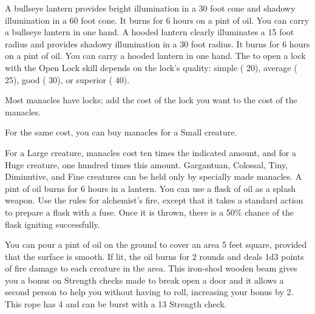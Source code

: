          A bullseye lantern provides bright illumination in a 30 foot cone and shadowy illumination in a 60 foot cone. It burns for 6 hours on a pint of oil. You can carry a bullseye lantern in one hand.
         A hooded lantern clearly illuminates a 15 foot radius and provides shadowy illumination in a 30 foot radius. It burns for 6 hours on a pint of oil. You can carry a hooded lantern in one hand.
         The  to open a lock with the Open Lock skill depends on the lock's quality: simple ( 20), average ( 25), good ( 30), or superior ( 40).
        \par Most manacles have locks; add the cost of the lock you want to the cost of the manacles.
        \par For the same cost, you can buy manacles for a Small creature.
        \par For a Large creature, manacles cost ten times the indicated amount, and for a Huge creature, one hundred times this amount. Gargantuan, Colossal, Tiny, Diminutive, and Fine creatures can be held only by specially made manacles.
         A pint of oil burns for 6 hours in a lantern. You can use a flask of oil as a splash weapon. Use the rules for alchemist's fire, except that it takes a standard action to prepare a flask with a fuse. Once it is thrown, there is a 50\% chance of the flask igniting successfully.
        \par You can pour a pint of oil on the ground to cover an area 5 feet square, provided that the surface is smooth. If lit, the oil burns for 2 rounds and deals 1d3 points of fire damage to each creature in the area.
         This iron-shod wooden beam gives you a  bonus on Strength checks made to break open a door and it allows a second person to help you without having to roll, increasing your bonus by 2.
         This rope has 4  and can be burst with a  13 Strength check.
